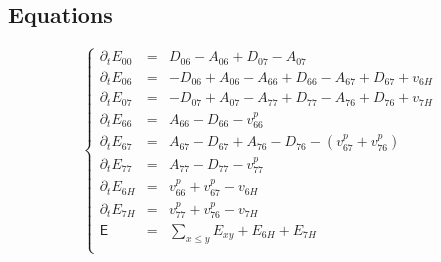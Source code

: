 \documentclass[aps,onecolumn,11pt]{revtex4}
\begin{document}
\subsection{Equations}
\begin{equation}
\left\lbrace
\begin{array}{rcl}
\partial_t E_{00} & = & D_{06}-A_{06} + D_{07}-A_{07}\\
\partial_t E_{06} & = & -D_{06}+A_{06} - A_{66} + D_{66} - A_{67} + D_{67} + v_{6H}\\
\partial_t E_{07} & = & -D_{07}+A_{07} - A_{77} + D_{77} - A_{76} + D_{76} + v_{7H}\\
\partial_t E_{66} & = & A_{66}-D_{66} -v^p_{66}\\
\partial_t E_{67} & = & A_{67}-D_{67} + A_{76}-D_{76} - (v^p_{67}+v^p_{76})\\
\partial_t E_{77} & = & A_{77}-D_{77} - v^p_{77}\\
\partial_t E_{6H} & = & v^p_{66}+v^p_{67} - v_{6H}\\
\partial_t E_{7H} & = & v^p_{77}+v^p_{76} - v_{7H}\\
\mathsf{E}      & = & {\displaystyle \sum_{x\leq y} E_{xy}}+E_{6H}+E_{7H}\\
\end{array}
\right.
\end{equation}
\end{document}
